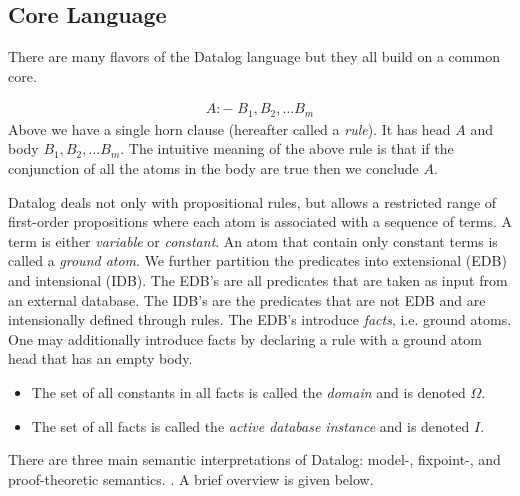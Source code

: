 \subsection{Core Language}
There are many flavors of the Datalog language but they all build on a common core. 

\begin{align*}
A :- \;B_1, B_2, \ldots B_m
\end{align*}
\noindent
Above we have a single horn clause (hereafter called a \textit{rule}). It has head $A$ and body $B_1, B_2, \ldots B_m$. The intuitive meaning of the above rule is that if the conjunction of all the atoms in the body are true then we conclude $A$.

Datalog deals not only with propositional rules, but allows a restricted range of first-order propositions where each atom is associated with a sequence of terms. A term is either \textit{variable} or \textit{constant}. An atom that contain only constant terms is called a \textit{ground atom}. We further partition the predicates into extensional (EDB) and intensional (IDB). The EDB's are all predicates that are taken as input from an external database. The IDB's are the predicates that are not EDB and are intensionally defined through rules. The EDB's introduce \textit{facts}, i.e. ground atoms. One may additionally introduce facts by declaring a rule with a ground atom head that has an empty body. 

\begin{itemize}
\item The set of all constants in all facts is called the \textit{domain} and is denoted $\Omega$.
\item The set of all facts is called the \textit{active database instance} and is denoted $I$.
\end{itemize}
 
There are three main semantic interpretations of Datalog: model-, fixpoint-, and proof-theoretic semantics. \cite{Green:2013:DRQ:2688167.2688168}. A brief overview is given below.


